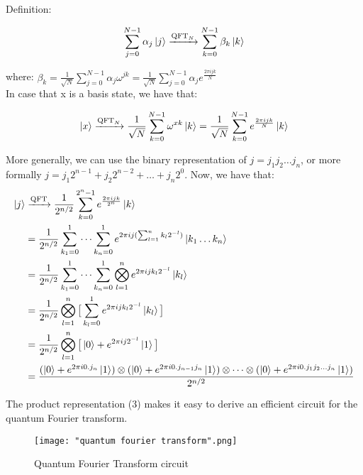 \documentclass[12pt]{article}
\begin{document}
Definition: 
 
$$\sum_{j = 0}^{N-1} \alpha_{j} \ket{j} \xrightarrow[\text{}]{\text{QFT}_{N}} \sum_{k = 0}^{N-1} \beta_{k} \ket{k} $$ 

where: $\beta_{k} = \frac{1}{\sqrt{N}} \sum_{j=0}^{N-1} \alpha_{j} {\omega}^{jk} = \frac{1}{\sqrt{N}} \sum_{j=0}^{N-1} \alpha_{j} e^{\frac{2 \pi ijk}{N}} $ \\

In case that x is a basis state, we have that: 

$$\ket{x} \xrightarrow[\text{}]{\text{QFT}_{N}} \frac{1}{\sqrt{N}} \sum_{k = 0}^{N-1} {\omega}^{xk} \ket{k} = \frac{1}{\sqrt{N}} \sum_{k = 0}^{N-1} e^{\frac{2 \pi ijk}{N}} \ket{k}$$

More generally, we can use the binary representation of $j = j_{1}j_{2}\dots j_{n}$, or more formally $j = j_{1}2^{n-1} + j_{2} 2^{n-2} + \dots + j_{n}2^{0}$. Now, we have that:
\begin{equation}
\begin{split}
\ket{j} &\xrightarrow[\text{}]{\text{QFT}} \frac{1}{2^{n/2}} \sum_{k=0}^{2^{n} - 1} e^{\frac{2 \pi ijk}{2^{n}}} \ket{k} \\
&= \frac{1}{2^{n/2}} \sum_{k_{1} = 0}^{1} \dots \sum_{k_{n} = 0}^{1} e^{2 \pi ij (\sum_{l = 1}^{n} k_{l} 2^{-l})} \ket{k_{1} \dots k_{n}} \\
&= \frac{1}{2^{n/2}} \sum_{k_{1} = 0}^{1} \dots \sum_{k_{n} = 0}^{1} \bigotimes_{l = 1}^{n} e ^{2 \pi ij k_{l} 2^{-l}} \ket{k_{l}} \\
&=  \frac{1}{2^{n/2}} \bigotimes_{l=1}^{n} \big[ \sum_{k_{l}=0}^{1} e^{2 \pi ij k_{l} 2 ^{-l}} \ket{k_{l}} \big] \\
&= \frac{1}{2^{n/2}} \bigotimes_{l=1}^{n} \big[ \ket{0} + e^{2 \pi ij2 ^{-l}} \ket{1} \big] \\
&= \frac{(\ket{0} + e^{2 \pi i 0.j_{n}} \ket{1}) \otimes (\ket{0} + e^{2 \pi i 0.j_{n-1}j_{n}} \ket{1}) \otimes \dots \otimes (\ket{0} + e^{2 \pi i 0.j_{1}j_{2} \dots j_{n}} \ket{1})}{2^{n/2}}
\end{split}
\end{equation}

The product representation (3) makes it easy to derive an efficient circuit for the quantum Fourier transform. 

\begin{figure}[h]
    \centering
    \texttt{[image: "quantum fourier transform".png]}
    \caption{Quantum Fourier Transform circuit}
    \label{fig: Quantum Fourier Transform circuit}
\end{figure}
\end{document}
